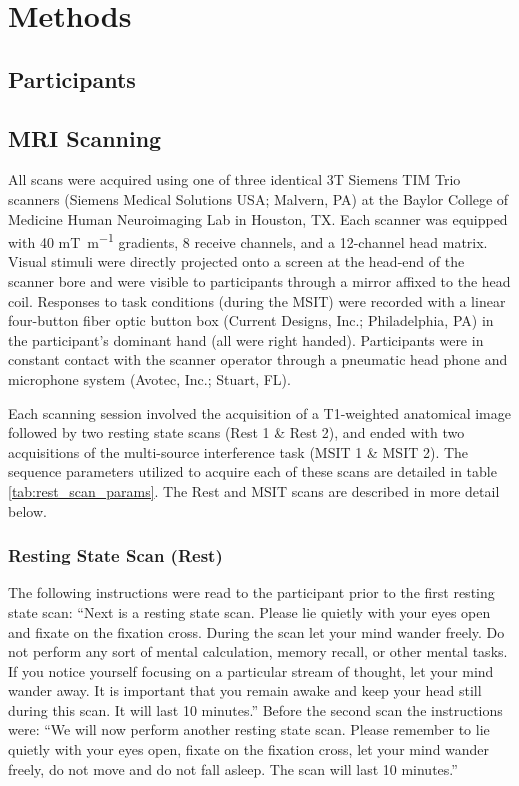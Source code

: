 \documentclass[english,11pt]{article}
\begin{document}
\section*{Methods }




\subsection*{Participants}

\subsection*{MRI Scanning}

All scans were acquired using one of three identical 3T Siemens TIM Trio scanners (Siemens Medical Solutions USA; Malvern, PA) at the Baylor College of Medicine Human Neuroimaging Lab in Houston, TX. Each scanner was equipped with 40 \si{\milli\tesla\per\meter} gradients, 8 receive channels, and a 12-channel head matrix. Visual stimuli were directly projected onto a screen at the head-end of the scanner bore and were visible to participants through a mirror affixed to the head coil. Responses to task conditions (during the MSIT) were recorded with a linear four-button fiber optic button box (Current Designs, Inc.; Philadelphia, PA) in the participant's dominant hand (all were right handed). Participants were in constant contact with the scanner operator through a pneumatic head phone and microphone system (Avotec, Inc.; Stuart, FL). 

Each scanning session involved the acquisition of a T1-weighted anatomical image followed by two resting state scans (Rest 1 \& Rest 2), and ended with two acquisitions of the multi-source interference task (MSIT 1 \& MSIT 2). The sequence parameters utilized to acquire each of these scans are detailed in table \ref{tab:rest_scan_params}. The Rest and MSIT scans are described in more detail below.

\subsubsection*{Resting State Scan (Rest)}

The following instructions were read to the participant prior to the first resting state scan: ``Next is a resting state scan.  Please lie quietly with your eyes open and fixate on the fixation cross.  During the scan let your mind wander freely.  Do not perform any sort of mental calculation, memory recall, or other mental tasks.  If you notice yourself focusing on a particular stream of thought, let your mind wander away.  It is important that you remain awake and keep your head still during this scan.  It will last 10 minutes.'' Before the second scan the instructions were: ``We will now perform another resting state scan.  Please remember to lie quietly with your eyes open, fixate on the fixation cross, let your mind wander freely, do not move and do not fall asleep.  The scan will last 10 minutes.''
\end{document}
